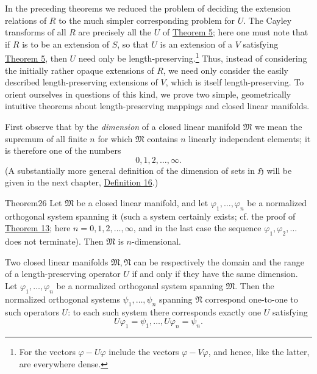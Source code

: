 ﻿\documentclass[paper=b5,fontsize=13pt,bookmarkpackage=false,twoside]{scrartcl}
\begin{document}
In the preceding theorems we reduced the problem of deciding the extension relations of $R$ to the much simpler corresponding problem for $U$. The Cayley transforms of all $R$ are precisely all the $U$ of \hyperref[thm:5]{Theorem 5}; here one must note that if $R$ is to be an extension of $S$, so that $U$ is an extension of a $V$ satisfying \hyperref[thm:5]{Theorem 5}, then $U$ need only be length-preserving.\footnote{\label{fn:43}For the vectors $\varphi-U\varphi$ include the vectors $\varphi-V\varphi$, and hence, like the latter, are everywhere dense.} Thus, instead of considering the initially rather opaque extensions of $R$, we need only consider the easily described length-preserving extensions of $V$, which is itself length-preserving. To orient ourselves in questions of this kind, we prove two simple, geometrically intuitive theorems about length-preserving mappings and closed linear manifolds.

First observe that by the \emph{dimension} of a closed linear manifold $\mathfrak M$ we mean the supremum of all finite $n$ for which $\mathfrak M$ contains $n$ linearly independent elements; it is therefore one of the numbers
\[
0,1,2,\ldots,\infty.
\]
(A substantially more general definition of the dimension of sets in $\mathfrak H$ will be given in the next chapter, \hyperref[def:16]{Definition 16}.)

\begin{namedstatement}{Theorem}{26}\label{thm:26}
Let $\mathfrak M$ be a closed linear manifold, and let $\varphi_1,\ldots,\varphi_n$ be a normalized orthogonal system spanning it (such a system certainly exists; cf. the proof of \hyperref[thm:13]{Theorem 13}; here $n=0,1,2,\ldots,\infty$, and in the last case the sequence $\varphi_1,\varphi_2,\ldots$ does not terminate). Then $\mathfrak M$ is $n$-dimensional.

Two closed linear manifolds $\mathfrak M,\mathfrak N$ can be respectively the domain and the range of a length-preserving operator $U$ if and only if they have the same dimension. Let $\varphi_1,\ldots,\varphi_n$ be a normalized orthogonal system spanning $\mathfrak M$. Then the normalized orthogonal systems $\psi_1,\ldots,\psi_n$ spanning $\mathfrak N$ correspond one-to-one to such operators $U$: to each such system there corresponds exactly one $U$ satisfying
\[
U\varphi_1=\psi_1,\ldots,U\varphi_n=\psi_n.
\]
\end{namedstatement}
\end{document}
